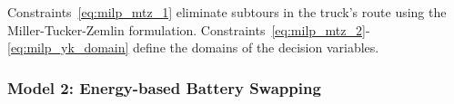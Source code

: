 \documentclass[3p, authoryear, 11pt]{elsarticle}
\begin{document}
Constraints~\eqref{eq:milp_mtz_1} eliminate subtours in the truck's route using the Miller-Tucker-Zemlin formulation. Constraints~\eqref{eq:milp_mtz_2}-\eqref{eq:milp_yk_domain} define the domains of the decision variables.




\subsubsection{Model 2: Energy-based Battery Swapping}
\label{sec:energy_model_math}



\end{document}
